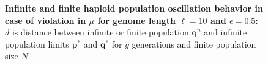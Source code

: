 \begin{figure}[H]
\begin{center}
\hspace{5pt}
\hspace{5pt}


\caption{\textbf{Infinite and finite haploid population oscillation behavior in case of violation in $\mu$ for genome length $\ell = 10$ and $\epsilon = 0.5$:} $d$ is
  distance between infinite or finite population ${\bm q}^n$ and infinite
  population limits ${{\bm p}^\ast}$ and ${{\bm q}^{\ast}}$ for $g$ generations and finite population size $N$.}
\label{oscillation_10h_vio_mu_0.5}
\end{center}
\end{figure}

